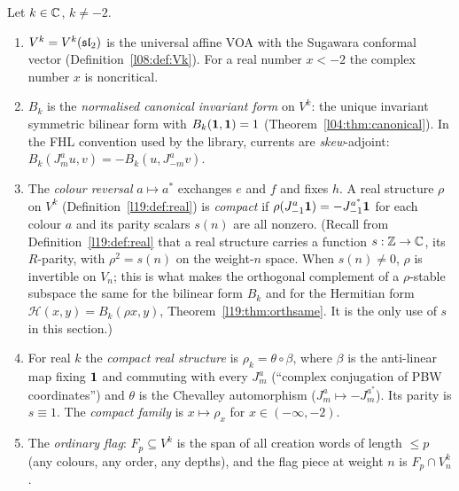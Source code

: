 \begin{definition}\label{l19:def:bcdata}
Let $k\in{\mathbb{C}}$, $k\ne-2$.
\begin{enumerate}
\item $V^k = V^k(\mathfrak{sl}_2)$ is the universal affine VOA with the Sugawara conformal vector
  (Definition~\ref{l08:def:Vk}). For a real number $x<-2$ the complex number $x$ is noncritical.
\item $B_k$ is the \emph{normalised canonical invariant form} on $V^k$: the unique invariant symmetric bilinear
  form with $B_k(\mathbf{1},\mathbf{1}) = 1$ (Theorem~\ref{l04:thm:canonical}). In the FHL convention
  used by the library, currents are \emph{skew}-adjoint: $B_k(J^a_mu,v) = -B_k(u,J^a_{-m}v)$.
\item The \emph{colour reversal} $a\mapsto a^*$ exchanges $e$ and $f$ and fixes $h$. A real structure $\rho$ on
  $V^k$ (Definition~\ref{l19:def:real}) is \emph{compact} if $\rho(J^a_{-1}\mathbf{1}) = -J^{a^*}_{-1}\mathbf{1}$
  for each colour $a$ and its parity scalars $s(n)$ are all nonzero. (Recall from Definition~\ref{l19:def:real} that a
  real structure carries a function $s:{\mathbb{Z}}\to{\mathbb{C}}$, its $R$-parity, with $\rho^2 = s(n)$ on the weight-$n$ space. When
  $s(n)\ne0$, $\rho$ is invertible on $V_n$; this is what makes the orthogonal complement of a $\rho$-stable subspace
  the same for the bilinear form $B_k$ and for the Hermitian form $\mathcal H(x,y) = B_k(\rho x,y)$,
  Theorem~\ref{l19:thm:orthsame}. It is the only use of $s$ in this section.)
\item For real $k$ the \emph{compact real structure} is $\rho_k = \theta\circ\beta$, where $\beta$ is the
  anti-linear map fixing $\mathbf{1}$ and commuting with every $J^a_m$ (``complex conjugation of PBW
  coordinates'') and $\theta$ is the Chevalley automorphism ($J^a_m\mapsto -J^{a^*}_m$). Its parity is $s\equiv1$.
  The \emph{compact family} is $x\mapsto\rho_x$ for $x\in(-\infty,-2)$.
\item The \emph{ordinary flag}: $F_p\subseteq V^k$ is the span of all creation words of length $\le p$ (any
  colours, any order, any depths), and the flag piece at weight $n$ is $F_p\cap V^k_n$.
\end{enumerate}
\end{definition}

